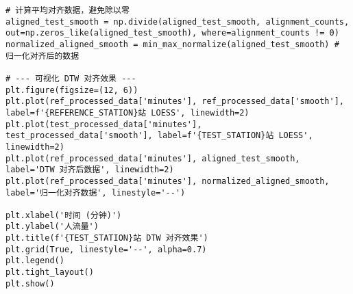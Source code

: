 \begin{lstlisting}[caption={求解 $P(t)$}]
# 计算平均对齐数据，避免除以零
aligned_test_smooth = np.divide(aligned_test_smooth, alignment_counts, out=np.zeros_like(aligned_test_smooth), where=alignment_counts != 0)
normalized_aligned_smooth = min_max_normalize(aligned_test_smooth) # 归一化对齐后的数据

# --- 可视化 DTW 对齐效果 ---
plt.figure(figsize=(12, 6))
plt.plot(ref_processed_data['minutes'], ref_processed_data['smooth'], label=f'{REFERENCE_STATION}站 LOESS', linewidth=2)
plt.plot(test_processed_data['minutes'], test_processed_data['smooth'], label=f'{TEST_STATION}站 LOESS', linewidth=2)
plt.plot(ref_processed_data['minutes'], aligned_test_smooth, label='DTW 对齐后数据', linewidth=2)
plt.plot(ref_processed_data['minutes'], normalized_aligned_smooth, label='归一化对齐数据', linestyle='--')

plt.xlabel('时间 (分钟)')
plt.ylabel('人流量')
plt.title(f'{TEST_STATION}站 DTW 对齐效果')
plt.grid(True, linestyle='--', alpha=0.7)
plt.legend()
plt.tight_layout()
plt.show()
\end{lstlisting}

